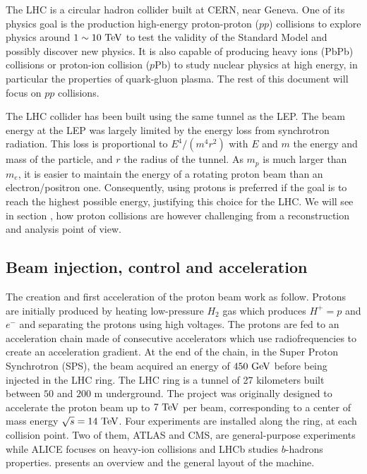 
    The LHC is a circular hadron collider built at CERN, near Geneva. One of its physics
    goal is the production high-energy proton-proton ($pp$) collisions to explore physics around
    $1\sim10 ~\text{TeV}$ to test the validity of the Standard Model and possibly discover new
    physics. It is also capable of producing heavy ions (PbPb) collisions or proton-ion
    collision ($p$Pb) to study nuclear physics at high energy, in particular the properties
    of quark-gluon plasma. The rest of this document will focus on $pp$ collisions.

    The LHC collider has been built using the same tunnel as the LEP. The beam energy at
    the LEP was largely limited by the energy loss from synchrotron radiation. This loss
    is proportional to $E^4 / (m^{4} r^{2})$ with $E$ and $m$ the energy and mass of the
    particle, and $r$ the radius of the tunnel. As $m_p$ is much larger than $m_e$, it is
    easier to maintain the energy of a rotating proton beam than an electron/positron one.
    Consequently, using protons is preferred if the goal is to reach the highest possible
    energy, justifying this choice for the LHC. We will see in section
    , how proton collisions are however challenging
    from a reconstruction and analysis point of view.

    \subsection{Beam injection, control and acceleration}

    The creation and first acceleration of the proton beam work as follow. Protons are initially
    produced by heating low-pressure $H_2$ gas which produces $H^+ = p$ and $e^-$ and
    separating the protons using high voltages. The protons are fed to an acceleration
    chain made of consecutive accelerators which use radiofrequencies to create an acceleration
    gradient. At the end of the chain, in the Super Proton Synchrotron (SPS), the
    beam acquired an energy of $450~\text{GeV}$ before being injected in the LHC ring. The LHC
    ring is a tunnel of 27 kilometers built between $50$ and $200$ m underground. The
    project was originally designed to accelerate the proton beam up to $7~\text{TeV}$ per beam,
    corresponding to a center of mass energy $\sqrt{s} = 14~\text{TeV}$. Four experiments are
    installed along the ring, at each collision point. Two of them, ATLAS and CMS, are
    general-purpose experiments while ALICE focuses on heavy-ion collisions and LHCb studies
    $b$-hadrons properties.  presents an overview and the general
    layout of the machine.

